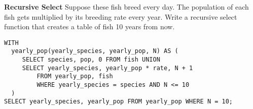 \documentclass{exam}
\begin{document}
\begin{questions}
\begin{blocksection}
\end{blocksection}

\question \textbf{Recursive Select} Suppose these fish breed every day. The population of each fish gets multiplied by its breeding rate every year. Write a recursive select function that creates a table of fish 10 years from now.

\begin{solution}[0.5in]
\begin{lstlisting}
WITH 
  yearly_pop(yearly_species, yearly_pop, N) AS (
     SELECT species, pop, 0 FROM fish UNION
     SELECT yearly_species, yearly_pop * rate, N + 1 
         FROM yearly_pop, fish 
         WHERE yearly_species = species AND N <= 10
  )
SELECT yearly_species, yearly_pop FROM yearly_pop WHERE N = 10;

\end{lstlisting}
\end{solution}


\end{questions}

\end{document}
